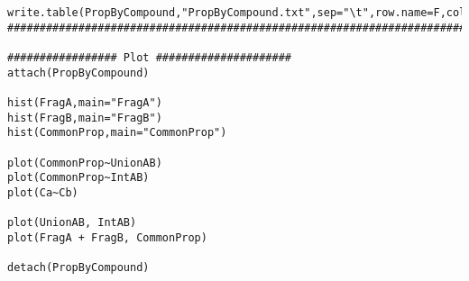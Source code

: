 \documentclass[11pt,letterpaper]{article}
\begin{document}
\begin{verbatim}
write.table(PropByCompound,"PropByCompound.txt",sep="\t",row.name=F,col.name=T)
#########################################################################################

################# Plot #####################
attach(PropByCompound)

hist(FragA,main="FragA")
hist(FragB,main="FragB")
hist(CommonProp,main="CommonProp")

plot(CommonProp~UnionAB)
plot(CommonProp~IntAB)
plot(Ca~Cb)

plot(UnionAB, IntAB)
plot(FragA + FragB, CommonProp)

detach(PropByCompound)

\end{verbatim}

\newpage




\end{document}
